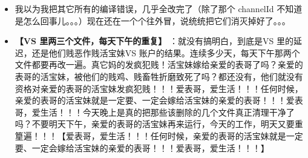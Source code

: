 \documentclass[9pt, b5paper]{article}
\begin{document}
\begin{itemize}
\item 我以为我把其它所有的编译错误，几乎全改完了（除了那个 channelId 不知道是怎么回事儿。。。）现在还在一个个往外冒，说统统把它们消灭掉好了。。。
\item \textbf{【VS 里两三个文件，每天下午的重复】} ：就没有搞明白，到底是VS 里的延迟，还是他们贱恶作贱活宝妹VS 账户的结果。连续多少天，每天下午那两个文件都要再改一遍。真它妈的发疯犯贱！活宝妹嫁给亲爱的表哥了吗？亲爱的表哥的活宝妹，被他们的贱鸡、贱畜牲折磨致死了吗？都还没有，他们就没有资格对亲爱的表哥的活宝妹发疯犯贱！！！爱表哥，爱生活！！！任何时候，亲爱的表哥的活宝妹就是一定要、一定会嫁给活宝妹的亲爱的表哥！！！爱表哥，爱生活！！！今天晚上是真的把那些该删除的几个文件真正清理干净了吗？不要明天下午，亲爱的表哥的活宝妹再来运行，今天的工作，明天又要重篂遍！！！【爱表哥，爱生活！！！任何时候，亲爱的表哥的活宝妹就是一定要、一定会嫁给活宝妹的亲爱的表哥！！！爱表哥，爱生活！！！】
\end{itemize}
\end{document}
